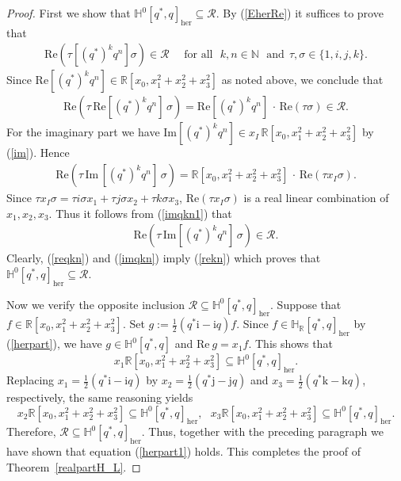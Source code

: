 \documentclass[10pt,a4paper]{amsart}
\begin{document}
\begin{proof}
First we show that
$ \mathbb{H}^{0}[q^{*}, q]_{\mathrm{her}}\subseteq \mathcal{R}$. By (\ref{EherRe})
it suffices to prove that
%
\begin{align}
\label{rekn}
\mathrm{Re} (\tau [ (q^{*})^{k}q^{n} ]\sigma ) \in \mathcal{R}\quad
\text{ for all} ~~~ k,n\in \mathbb{N}~~~\text{and}~~\tau , \sigma \in
\{1,i,j,k\}.
\end{align}
%
Since
$\mathrm{Re}[(q^{*})^{k}q^{n}] \in \mathbb{R}[x_{0},x_{1}^{2}+x_{2}^{2}+x_{3}^{2}]$
as noted above, we conclude that
%
\begin{align}
\label{reqkn}
\mathrm{Re} (\tau \, \mathrm{Re} [ (q^{*})^{k}q^{n} ]\,\sigma )=
\mathrm{Re} [ (q^{*})^{k}q^{n} ]\, \cdot \, \mathrm{Re} (\tau \sigma )
\in \mathcal{R}.
\end{align}
%
For the imaginary part we have
$\mathrm{Im}[(q^{*})^{k}q^{n}] \in x_{I} \, \mathbb{R}[x_{0},x_{1}^{2}+x_{2}^{2}+x_{3}^{2}]$
by (\ref{im}). Hence
%
\begin{align}
\label{imqkn1}
\mathrm{Re} (\tau \, \mathrm{Im} \, [ (q^{*})^{k}q^{n} ]\, \sigma )=
\mathbb{R}[x_{0},x_{1}^{2}+x_{2}^{2}+x_{3}^{2}]\, \cdot \,
\mathrm{Re} (\tau x_{I} \sigma ).
\end{align}
%
Since
$\tau x_{I} \sigma =\tau i \sigma x_{1}+ \tau j\sigma x_{2}+ \tau k
\sigma x_{3}$, $\mathrm{Re} (\tau x_{I} \sigma )$ is a real linear combination
of $x_{1},x_{2},x_{3}$. Thus it follows from (\ref{imqkn1}) that
%
\begin{align}
\label{imqkn}
\mathrm{Re} (\tau \, \mathrm{Im} [ (q^{*})^{k}q^{n} ]\,\sigma )\in
\mathcal{R}.
\end{align}
%
Clearly, (\ref{reqkn}) and (\ref{imqkn}) imply (\ref{rekn}) which proves
that $ \mathbb{H}^{0}[q^{*}, q]_{\mathrm{her}}\subseteq \mathcal{R}$.

Now we verify the opposite inclusion
$\mathcal{R}\subseteq \mathbb{H}^{0}[q^{*}, q]_{\mathrm{her}}$. Suppose
that $f\in \mathbb{R}[x_{0},x_{1}^{2}+x_{2}^{2}+x_{3}^{2}]$. Set
$g:=\frac{1}{2}(q^{*}\mathrm{i}-\mathrm{i}q) f$. Since
$f\in \mathbb{H}_{\mathbb{R}}[q^{*}, q]_{\mathrm{her}}$ by (\ref{herpart}),
we have $g\in \mathbb{H}^{0}[q^{*}, q]$ and
$\mathrm{Re} ~ g= x_{1} f$. This shows that
%
\begin{equation*}
x_{1} \mathbb{R}[x_{0},x_{1}^{2}+x_{2}^{2}+x_{3}^{2}] \subseteq
\mathbb{H}^{0}[q^{*}, q]_{\mathrm{her}}.
\end{equation*}
%
Replacing $x_{1}= \frac{1}{2}(q^{*}\mathrm{i}-\mathrm{i}q)$ by
$x_{2}= \frac{1}{2}(q^{*}\mathrm{j}- \mathrm{j}q) $ and
$x_{3}= \frac{1}{2}(q^{*}\mathrm{k}-\mathrm{k}q) $, respectively, the same
reasoning yields
%
\begin{equation*}
x_{2} \mathbb{R}[x_{0},x_{1}^{2}+x_{2}^{2}+x_{3}^{2}] \subseteq
\mathbb{H}^{0}[q^{*}, q]_{\mathrm{her}}, ~~~ x_{3} \mathbb{R}[x_{0},x_{1}^{2}+x_{2}^{2}+x_{3}^{2}]
\subseteq \mathbb{H}^{0}[q^{*}, q]_{\mathrm{her}}.
\end{equation*}
%
Therefore,
$\mathcal{R}\subseteq \mathbb{H}^{0}[q^{*}, q]_{\mathrm{her}}$. Thus, together
with the preceding paragraph we have shown that equation (\ref{herpart1})
holds. This completes the proof of Theorem~\ref{realpartH_L}.
\end{proof}
\end{document}
